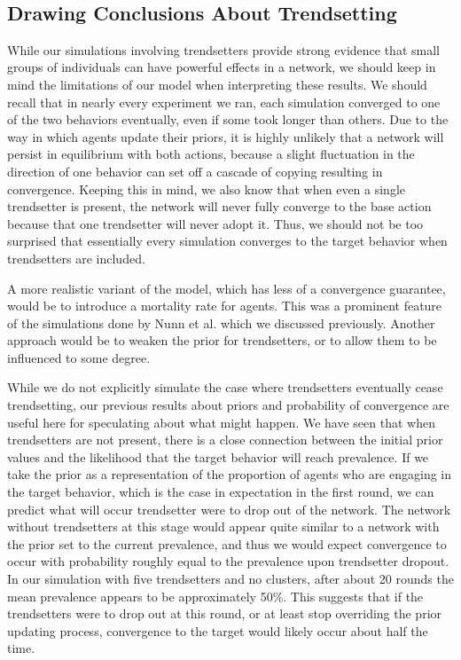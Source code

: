 \documentclass[11pt]{article}
\begin{document}
    \begin{center}
    \end{center}
    { \hspace*{\fill} \\}
    
    \hypertarget{drawing-conclusions-about-trendsetting}{%
\subsection{Drawing Conclusions About
Trendsetting}\label{drawing-conclusions-about-trendsetting}}

While our simulations involving trendsetters provide strong evidence
that small groups of individuals can have powerful effects in a network,
we should keep in mind the limitations of our model when interpreting
these results. We should recall that in nearly every experiment we ran,
each simulation converged to one of the two behaviors eventually, even
if some took longer than others. Due to the way in which agents update
their priors, it is highly unlikely that a network will persist in
equilibrium with both actions, because a slight fluctuation in the
direction of one behavior can set off a cascade of copying resulting in
convergence. Keeping this in mind, we also know that when even a single
trendsetter is present, the network will never fully converge to the
base action because that one trendsetter will never adopt it. Thus, we
should not be too surprised that essentially every simulation converges
to the target behavior when trendsetters are included.

A more realistic variant of the model, which has less of a convergence
guarantee, would be to introduce a mortality rate for agents. This was a
prominent feature of the simulations done by Nunn et al. which we
discussed previously. Another approach would be to weaken the prior for
trendsetters, or to allow them to be influenced to some degree.

While we do not explicitly simulate the case where trendsetters
eventually cease trendsetting, our previous results about priors and
probability of convergence are useful here for speculating about what
might happen. We have seen that when trendsetters are not present, there
is a close connection between the initial prior values and the
likelihood that the target behavior will reach prevalence. If we take
the prior as a representation of the proportion of agents who are
engaging in the target behavior, which is the case in expectation in the
first round, we can predict what will occur trendsetter were to drop out
of the network. The network without trendsetters at this stage would
appear quite similar to a network with the prior set to the current
prevalence, and thus we would expect convergence to occur with
probability roughly equal to the prevalence upon trendsetter dropout. In
our simulation with five trendsetters and no clusters, after about 20
rounds the mean prevalence appears to be approximately 50\%. This
suggests that if the trendsetters were to drop out at this round, or at
least stop overriding the prior updating process, convergence to the
target would likely occur about half the time.
\end{document}
